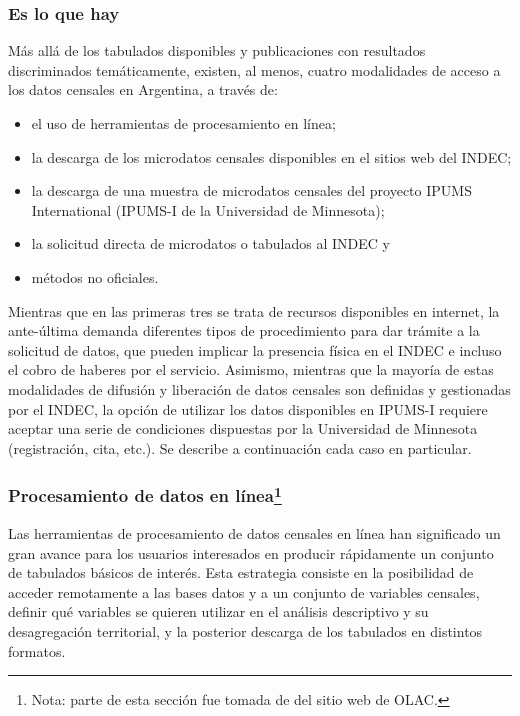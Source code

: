 \documentclass[
]{article}
\providecommand{\tightlist}{%
  \setlength{\itemsep}{0pt}\setlength{\parskip}{0pt}}
\begin{document}
\hypertarget{es-lo-que-hay}{%
\subsubsection{Es lo que hay}\label{es-lo-que-hay}}

Más allá de los tabulados disponibles y publicaciones con resultados discriminados temáticamente, existen, al menos, cuatro modalidades de acceso a los datos censales en Argentina, a través de:

\begin{itemize}
\tightlist
\item
  el uso de herramientas de procesamiento en línea;
\item
  la descarga de los microdatos censales disponibles en el sitios web del INDEC;
\item
  la descarga de una muestra de microdatos censales del proyecto IPUMS International (IPUMS-I de la Universidad de Minnesota);
\item
  la solicitud directa de microdatos o tabulados al INDEC y
\item
  métodos no oficiales.
\end{itemize}

Mientras que en las primeras tres se trata de recursos disponibles en internet, la ante-última demanda diferentes tipos de procedimiento para dar trámite a la solicitud de datos, que pueden implicar la presencia física en el INDEC e incluso el cobro de haberes por el servicio. Asimismo, mientras que la mayoría de estas modalidades de difusión y liberación de datos censales son definidas y gestionadas por el INDEC, la opción de utilizar los datos disponibles en IPUMS-I requiere aceptar una serie de condiciones dispuestas por la Universidad de Minnesota (registración, cita, etc.). Se describe a continuación cada caso en particular.

\hypertarget{procesamiento-de-datos-en-luxednea03u-1}{%
\subsubsection[Procesamiento de datos en línea]{\texorpdfstring{Procesamiento de datos en línea\footnote{Nota: parte de esta sección fue tomada de del sitio web de OLAC.}}{Procesamiento de datos en línea}}\label{procesamiento-de-datos-en-luxednea03u-1}}

Las herramientas de procesamiento de datos censales en línea han significado un gran avance para los usuarios interesados en producir rápidamente un conjunto de tabulados básicos de interés. Esta estrategia consiste en la posibilidad de acceder remotamente a las bases datos y a un conjunto de variables censales, definir qué variables se quieren utilizar en el análisis descriptivo y su desagregación territorial, y la posterior descarga de los tabulados en distintos formatos.
\end{document}
